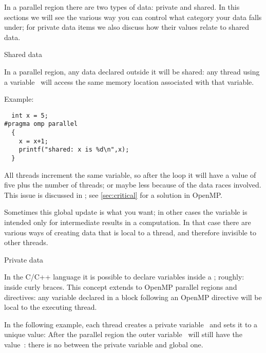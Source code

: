 
\label{sec:ompdata}

In a parallel region there are two types of data: private and shared.
In this sections we will see the various way you can control what category
your data falls under; for private data items we also discuss how their values
relate to shared data.

 {Shared data}

In a parallel region, any data declared outside it will be shared:
any thread using a variable~ will access the same memory location
associated with that variable.

Example:
\begin{lstlisting}
  int x = 5;
#pragma omp parallel
  {
    x = x+1;
    printf("shared: x is %d\n",x);
  }
\end{lstlisting}
All threads increment the same variable, so after the loop it will
have a value of five plus the number of threads;
or maybe less because of the data races involved.
This issue is discussed in ;
see \ref{sec:critical} for a solution in OpenMP.

Sometimes this global update is what you want; in other cases the
variable is intended only for intermediate results in a computation.
In that case 
there are various ways of creating
data that is local to a thread, and therefore invisible to other threads.

 {Private data}
\label{sec:omp-private}

In the C/C++ language it is possible to declare variables inside
a ; roughly: inside curly braces.
This concept extends to OpenMP parallel regions and directives:
any variable declared in a block following an OpenMP directive
will be local to the executing thread.

In the following example, each thread creates a private variable~
and sets it to a unique value:
%
%
After the parallel region the outer variable~ will still have the
value~: there is no  between the
private variable and global one.

